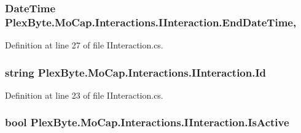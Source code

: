 \subsubsection[{\texorpdfstring{End\+Date\+Time}{EndDateTime}}]{\setlength{\rightskip}{0pt plus 5cm}Date\+Time Plex\+Byte.\+Mo\+Cap.\+Interactions.\+I\+Interaction.\+End\+Date\+Time\hspace{0.3cm}{\ttfamily [get]}, {\ttfamily [set]}}\hypertarget{interface_plex_byte_1_1_mo_cap_1_1_interactions_1_1_i_interaction_a555336719848fe4e8e8cec0b651de96e}{}\label{interface_plex_byte_1_1_mo_cap_1_1_interactions_1_1_i_interaction_a555336719848fe4e8e8cec0b651de96e}


Definition at line 27 of file I\+Interaction.\+cs.

\subsubsection[{\texorpdfstring{Id}{Id}}]{\setlength{\rightskip}{0pt plus 5cm}string Plex\+Byte.\+Mo\+Cap.\+Interactions.\+I\+Interaction.\+Id\hspace{0.3cm}{\ttfamily [get]}}\hypertarget{interface_plex_byte_1_1_mo_cap_1_1_interactions_1_1_i_interaction_aa3e9cbd6df674752a1746b11c08b9967}{}\label{interface_plex_byte_1_1_mo_cap_1_1_interactions_1_1_i_interaction_aa3e9cbd6df674752a1746b11c08b9967}


Definition at line 23 of file I\+Interaction.\+cs.

\subsubsection[{\texorpdfstring{Is\+Active}{IsActive}}]{\setlength{\rightskip}{0pt plus 5cm}bool Plex\+Byte.\+Mo\+Cap.\+Interactions.\+I\+Interaction.\+Is\+Active\hspace{0.3cm}{\ttfamily [get]}}\hypertarget{interface_plex_byte_1_1_mo_cap_1_1_interactions_1_1_i_interaction_a6ff177af835714ffd17f27b9016ef131}{}\label{interface_plex_byte_1_1_mo_cap_1_1_interactions_1_1_i_interaction_a6ff177af835714ffd17f27b9016ef131}


